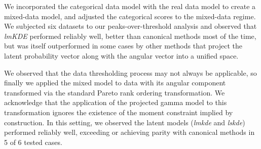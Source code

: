We incorporated the categorical data model with the real data model to create a 
    mixed-data model, and adjusted the categorical scores to the mixed-data 
    regime.  We subjected six datasets to our peaks-over-threshold analysis and 
    observed that \emph{lmKDE} performed reliably well, better than canonical 
    methods most of the time, but was itself outperformed in some cases by other 
    methods that project the latent probability vector along with the angular 
    vector into a unified space.

We observed that the data thresholding process may not always be applicable, so 
    finally we applied the mixed model to data with its angular component 
    transformed via the standard Pareto rank ordering transformation.  We
    acknowledge that the application of the projected gamma model to this
    transformation ignores the existence of the moment constraint implied by
    construction. In this setting, we observed the latent models (\emph{lmkde} 
    and \emph{lskde}) performed reliably well, exceeding or achieving parity
    with canonical methods in 5 of 6 tested cases.

